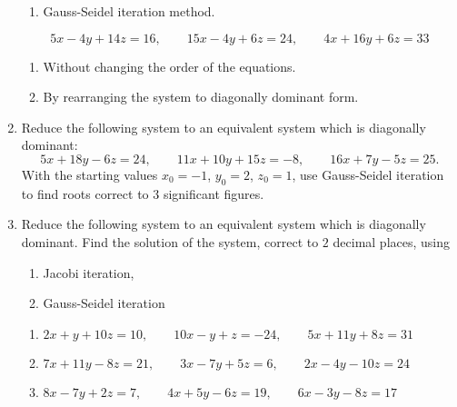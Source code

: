 \documentclass[12pt,class=book,crop=false]{standalone}
\begin{document}
\begin{enumerate}
\begin{enumerate}
              \item Gauss-Seidel iteration method.
          \end{enumerate}
          \[5x-4y+14z=16,\qquad15x-4y+6z=24,\qquad4x+16y+6z=33\]
          \begin{enumerate}[label={(\roman*)}]
              \item Without changing the order of the equations.
              \item By rearranging the system to diagonally dominant form.
          \end{enumerate}
    \item Reduce the following system to an equivalent system which is diagonally dominant:
          \[5x + 18y -6 z = 24,\qquad   11x +10 y  + 15z = -8,\qquad   16x + 7 y - 5 z = 25.\]
          With the starting values $ x_0 = -1 $,  $ y_0 = 2 $,   $ z_0 = 1 $, use Gauss-Seidel iteration to find  roots correct  to $ 3 $ significant figures.
    \item Reduce the following system to an equivalent system which is diagonally dominant. Find the solution of the system, correct to $ 2 $ decimal places, using
          \begin{enumerate}[label={(\roman*)}]
              \item Jacobi iteration,
              \item Gauss-Seidel iteration
          \end{enumerate}
          \begin{enumerate}
              \item $2x+y+10z=10,\qquad10x-y+z=-24,\qquad5x+11y+8z=31 $         
              \item $7x+11y-8z=21,\qquad 3x-7y+5z=6,\qquad 2x-4y-10z=24$
              \item $8x-7y+2z=7,\qquad 4x+5y-6z=19,\qquad 6x-3y-8z=17$
          \end{enumerate}
\end{enumerate}
\end{document}
